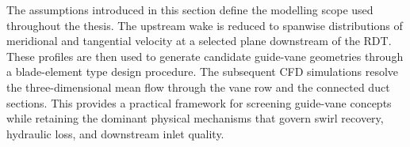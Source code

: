 The assumptions introduced in this section define the modelling scope used throughout the thesis. The upstream wake is reduced to spanwise distributions of meridional and tangential velocity at a selected plane downstream of the RDT. These profiles are then used to generate candidate guide-vane geometries through a blade-element type design procedure. The subsequent CFD simulations resolve the three-dimensional mean flow through the vane row and the connected duct sections. This provides a practical framework for screening guide-vane concepts while retaining the dominant physical mechanisms that govern swirl recovery, hydraulic loss, and downstream inlet quality.



\clearpage %